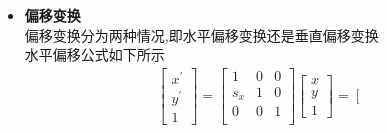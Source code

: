 \documentclass[UTF8,a4paper,10pt]{ctexart}
\begin{document}
\begin{flushleft}
\begin{itemize}
\begin{eqnarray}
\begin{array}{c}
                    c_{y}y\\
                    1
                \end{array}\right]\nonumber
            \end{eqnarray}
            这里我们选择了缩小变换,如下图所示
            \begin{figure}[htbp]
                \centering
                \caption{图像尺度变换}
                \label{fig:fig_enlarge}
            \end{figure}
            \item \textbf{偏移变换}\\
            \hspace{2em}偏移变换分为两种情况,即水平偏移变换还是垂直偏移变换\\
            水平偏移公式如下所示
            \begin{eqnarray}
                \left[\begin{array}{c}
                    x^{\prime}\\
                    y^{\prime}\\
                    1
                \end{array}\right]=\left[\begin{array}{ccc}
                    1 & 0 & 0\\
                    s_{x} & 1 & 0\\
                    0 & 0 & 1\\
                \end{array}\right]\left[\begin{array}{c}
                    x\\
                    y\\
                    1
                \end{array}\right]=\left[\begin{array}{c}

\end{array}
\end{eqnarray}
\end{itemize}
\end{flushleft}
\end{document}
